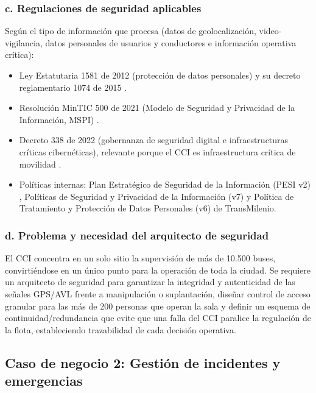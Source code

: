 \subsubsection*{c. Regulaciones de seguridad aplicables}

Según el tipo de información que procesa (datos de geolocalización, video-vigilancia, datos personales de usuarios y conductores e información operativa crítica):

\begin{itemize}
	\item Ley Estatutaria 1581 de 2012 (protección de datos personales) y su decreto reglamentario 1074 de 2015 \parencite{ley1581de2012,decreto1074de2015}.
	\item Resolución MinTIC 500 de 2021 (Modelo de Seguridad y Privacidad de la Información, MSPI) \parencite{mintic2021}.
	\item Decreto 338 de 2022 (gobernanza de seguridad digital e infraestructuras críticas cibernéticas), relevante porque el CCI es infraestructura crítica de movilidad \parencite{decreto338de2022}.
	\item Políticas internas: Plan Estratégico de Seguridad de la Información (PESI v2) \parencite{transmilenio2025pesi}, Políticas de Seguridad y Privacidad de la Información (v7) y Política de Tratamiento y Protección de Datos Personales (v6) de TransMilenio.
\end{itemize}

\subsubsection*{d. Problema y necesidad del arquitecto de seguridad}

El CCI concentra en un solo sitio la supervisión de más de 10.500 buses, convirtiéndose en un único punto para la operación de toda la ciudad. Se requiere un arquitecto de seguridad para garantizar la integridad y autenticidad de las señales GPS/AVL frente a manipulación o suplantación, diseñar control de acceso granular para las más de 200 personas que operan la sala y definir un esquema de continuidad/redundancia que evite que una falla del CCI paralice la regulación de la flota, estableciendo trazabilidad de cada decisión operativa.

\subsection{Caso de negocio 2: Gestión de incidentes y emergencias}

